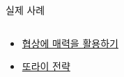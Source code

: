 \documentclass[final]{beamer}
\begin{document}
\begin{frame}[t]{실제 사례}
	\begin{columns}[t] %
		\begin{column}{0.5\linewidth} %
		\begin{itemize}
			\item \href{http://www.youtube.com/watch?v=p3Uos2fzIJ0}{협상에 매력을 활용하기}
			\item \href{http://www.youtube.com/watch?v=S0qjK3TWZE8}{또라이 전략}
		\end{itemize}
		\end{column}
		\begin{column}[T]{0.5\linewidth} %
		\end{column}
	\end{columns}
\end{frame}

\end{document}
